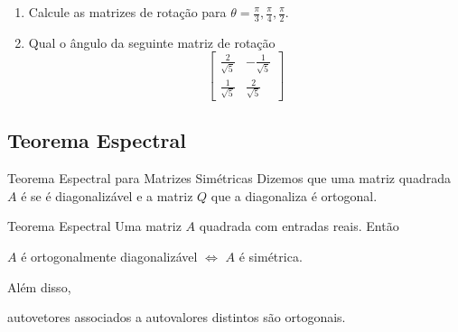 \begin{frame}[label=orto]
\begin{casa}
\begin{enumerate}
\item Calcule as matrizes de rotação para $\theta=\frac{\pi}{3},\frac{\pi}{4}, \frac{\pi}{2}$.

\item Qual o ângulo da seguinte matriz de rotação
\[
\begin{bmatrix}
\frac{2}{\sqrt{5}} & -\frac{1}{\sqrt{5}} \\[1em] \frac{1}{\sqrt{5}} & \frac{2}{\sqrt{5}}
\end{bmatrix}
\]
\end{enumerate}
\end{casa}

\end{frame}


%
%
%
%

\subsection*{Teorema Espectral}

\begin{frame}[label=orto]{Teorema Espectral para Matrizes Simétricas}
Dizemos que uma matriz quadrada $A$ é  se é 
diagonalizável e a matriz $Q$ que a diagonaliza é ortogonal.

\begin{block}{Teorema Espectral}
Uma matriz  $A$ quadrada com entradas reais. Então
\begin{center}
 $A$ é {\color{blue}ortogonalmente diagonalizável} \(\Leftrightarrow\) $A$ é {\color{blue} simétrica}.
\end{center}
Além disso, 
\begin{center}
{\color{red}autovetores associados a autovalores distintos são ortogonais}.
\end{center}
\end{block}

\end{frame}

